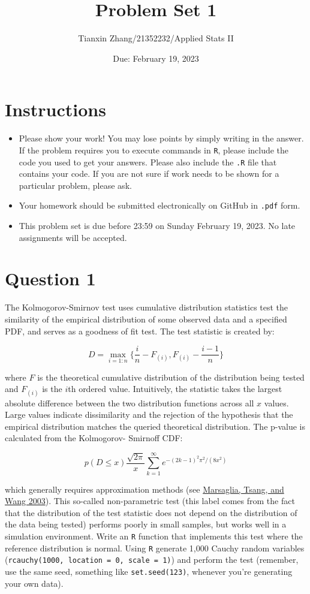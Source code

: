\documentclass[12pt,letterpaper]{article}
\title{Problem Set 1}
\date{Due: February 19, 2023}
\author{Tianxin Zhang/21352232/Applied Stats II}
\begin{document}
	\maketitle
	\section*{Instructions}
	\begin{itemize}
	\item Please show your work! You may lose points by simply writing in the answer. If the problem requires you to execute commands in \texttt{R}, please include the code you used to get your answers. Please also include the \texttt{.R} file that contains your code. If you are not sure if work needs to be shown for a particular problem, please ask.
\item Your homework should be submitted electronically on GitHub in \texttt{.pdf} form.
\item This problem set is due before 23:59 on Sunday February 19, 2023. No late assignments will be accepted.
	\end{itemize}

	\vspace{.25cm}
\section*{Question 1} 
\vspace{.25cm}
\noindent The Kolmogorov-Smirnov test uses cumulative distribution statistics test the similarity of the empirical distribution of some observed data and a specified PDF, and serves as a goodness of fit test. The test statistic is created by:

$$D = \max_{i=1:n} \Big\{ \frac{i}{n}  - F_{(i)}, F_{(i)} - \frac{i-1}{n} \Big\}$$

\noindent where $F$ is the theoretical cumulative distribution of the distribution being tested and $F_{(i)}$ is the $i$th ordered value. Intuitively, the statistic takes the largest absolute difference between the two distribution functions across all $x$ values. Large values indicate dissimilarity and the rejection of the hypothesis that the empirical distribution matches the queried theoretical distribution. The p-value is calculated from the Kolmogorov-
Smirnoff CDF:

$$p(D \leq x) \frac{\sqrt {2\pi}}{x} \sum _{k=1}^{\infty }e^{-(2k-1)^{2}\pi ^{2}/(8x^{2})}$$


\noindent which generally requires approximation methods (see \href{https://core.ac.uk/download/pdf/25787785.pdf}{Marsaglia, Tsang, and Wang 2003}). This so-called non-parametric test (this label comes from the fact that the distribution of the test statistic does not depend on the distribution of the data being tested) performs poorly in small samples, but works well in a simulation environment. Write an \texttt{R} function that implements this test where the reference distribution is normal. Using \texttt{R} generate 1,000 Cauchy random variables (\texttt{rcauchy(1000, location = 0, scale = 1)}) and perform the test (remember, use the same seed, something like \texttt{set.seed(123)}, whenever you're generating your own data).\\
	
\end{document}
